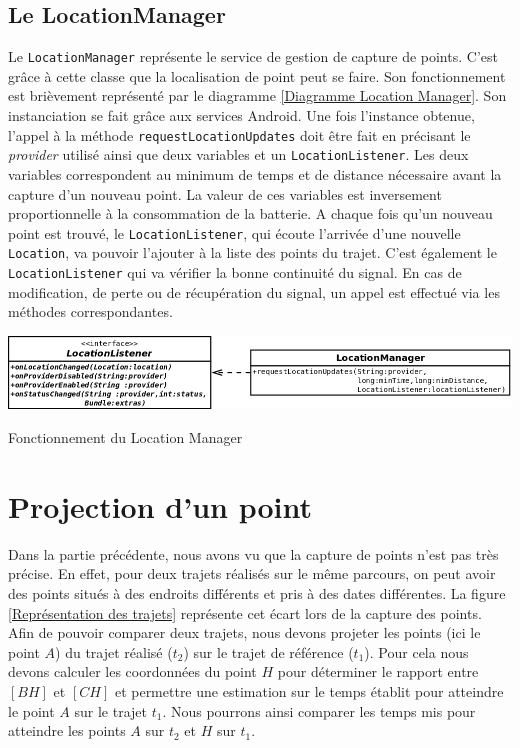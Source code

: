 \subsection{Le LocationManager}
\label{locationManager}
Le \verb!LocationManager! représente le service de gestion de capture de points. C'est grâce à cette classe que la localisation de point peut se faire. Son fonctionnement est brièvement représenté par le diagramme \ref{Diagramme Location Manager}. Son instanciation se fait grâce aux services Android. Une fois l'instance obtenue, l'appel à la méthode \verb!requestLocationUpdates! doit être fait en précisant le \textit{provider} utilisé ainsi que deux variables et un \verb!LocationListener!. Les deux variables correspondent au minimum de temps et de distance nécessaire avant la capture d'un nouveau point. La valeur de ces variables est inversement proportionnelle à la consommation de la batterie. A chaque fois qu'un nouveau point est trouvé, le \verb!LocationListener!, qui écoute l'arrivée d'une nouvelle \verb!Location!, va pouvoir l'ajouter  à la liste des points du trajet. C'est également le \verb!LocationListener! qui va vérifier la bonne continuité du signal. En cas de modification, de perte ou de récupération du signal, un appel est effectué via les méthodes correspondantes.

\begin{img}  
	\includegraphics[scale=0.65]{img/LocationManager.png}
	\caption{Fonctionnement du Location Manager}
	\label{Diagramme Location Manager}
\end{img}

\section{Projection d'un point}
Dans la partie précédente, nous avons vu que la capture de points n'est pas très précise. En effet, pour deux trajets réalisés sur le même parcours, on peut avoir des points situés à des endroits différents et pris à des dates différentes. La figure \ref{Représentation des trajets} représente cet écart lors de la capture des points. Afin de pouvoir comparer deux trajets, nous devons projeter les points (ici le point $A$) du trajet réalisé ($t_2$) sur le trajet de référence ($t_1$). Pour cela nous devons calculer les coordonnées du point $H$ pour déterminer le rapport entre $[BH]$ et $[CH]$ et permettre une estimation sur le temps établit pour atteindre le point $A$ sur le trajet $t_1$. Nous pourrons ainsi comparer les temps mis pour atteindre les points $A$ sur $t_2$ et $H$ sur $t_1$.

